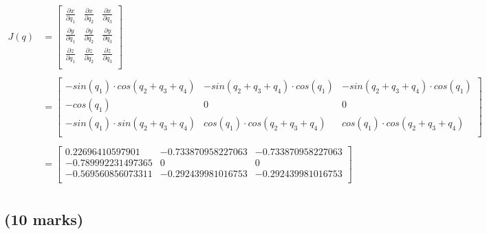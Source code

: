 \begin{align*}
    J(q) &= \begin{bmatrix}
        \frac{\partial x}{\partial q_1} & \frac{\partial x}{\partial q_2} & \frac{\partial x}{\partial q_3} \\[0.5em]
        \frac{\partial y}{\partial q_1} & \frac{\partial y}{\partial q_2} & \frac{\partial y}{\partial q_3} \\[0.5em]
        \frac{\partial z}{\partial q_1} & \frac{\partial z}{\partial q_2} & \frac{\partial z}{\partial q_3} \\[0.5em]
    \end{bmatrix} \\
    \\
    &= \begin{bmatrix}
        -sin(q_1) \cdot cos(q_2 + q_3 + q_4) &
        -sin(q_2 + q_3 + q_4) \cdot cos(q_1) &
        -sin(q_2 + q_3 + q_4) \cdot cos(q_1) \\
        -cos(q_1) &
                0 &
                0 \\
        -sin(q_1) \cdot sin(q_2 + q_3 + q_4) &
         cos(q_1) \cdot cos(q_2 + q_3 + q_4) &
         cos(q_1) \cdot cos(q_2 + q_3 + q_4) \\
    \end{bmatrix} \\
    \\
    &= \begin{bmatrix}
         0.22696410597901  &
        -0.733870958227063 &
        -0.733870958227063 \\
        -0.789992231497365 &
                0          &
                0          \\
        -0.569560856073311 &
        -0.292439981016753 &
        -0.292439981016753 \\
    \end{bmatrix} \\
\end{align*}


\subsection{(10 marks)}

\newpage
